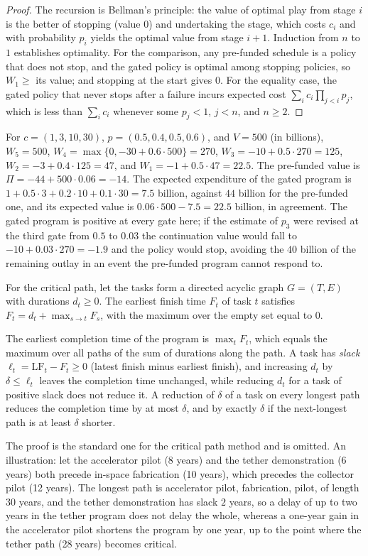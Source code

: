 \begin{proof}
The recursion is Bellman's principle: the value of optimal play from stage $i$ is the better of stopping (value $0$) and undertaking the stage, which costs $c_i$ and with probability $p_i$ yields the optimal value from stage $i+1$. Induction from $n$ to $1$ establishes optimality. For the comparison, any pre-funded schedule is a policy that does not stop, and the gated policy is optimal among stopping policies, so $W_1\ge$ its value; and stopping at the start gives $0$. For the equality case, the gated policy that never stops after a failure incurs expected cost $\sum_ic_i\prod_{j<i}p_j$, which is less than $\sum_ic_i$ whenever some $p_j<1$, $j<n$, and $n\ge2$.
\end{proof}

For $c=(1,3,10,30)$, $p=(0.5,0.4,0.5,0.6)$, and $V=500$ (in billions), $W_5=500$, $W_4=\max\{0,-30+0.6\cdot500\}=270$, $W_3=-10+0.5\cdot270=125$, $W_2=-3+0.4\cdot125=47$, and $W_1=-1+0.5\cdot47=22.5$. The pre-funded value is $\Pi=-44+500\cdot0.06=-14$. The expected expenditure of the gated program is $1+0.5\cdot3+0.2\cdot10+0.1\cdot30=7.5$ billion, against $44$ billion for the pre-funded one, and its expected value is $0.06\cdot500-7.5=22.5$ billion, in agreement. The gated program is positive at every gate here; if the estimate of $p_3$ were revised at the third gate from $0.5$ to $0.03$ the continuation value would fall to $-10+0.03\cdot270=-1.9$ and the policy would stop, avoiding the $40$ billion of the remaining outlay in an event the pre-funded program cannot respond to.

For the critical path, let the tasks form a directed acyclic graph $G=(T,E)$ with durations $d_t\ge0$. The earliest finish time $F_t$ of task $t$ satisfies $F_t=d_t+\max_{s\to t}F_s$, with the maximum over the empty set equal to $0$.

\begin{proposition}
The earliest completion time of the program is $\max_tF_t$, which equals the maximum over all paths of the sum of durations along the path. A task has \emph{slack} $\ell_t=\mathrm{LF}_t-F_t\ge0$ (latest finish minus earliest finish), and increasing $d_t$ by $\delta\le\ell_t$ leaves the completion time unchanged, while reducing $d_t$ for a task of positive slack does not reduce it. A reduction of $\delta$ of a task on every longest path reduces the completion time by at most $\delta$, and by exactly $\delta$ if the next-longest path is at least $\delta$ shorter.
\end{proposition}

The proof is the standard one for the critical path method and is omitted. An illustration: let the accelerator pilot (8 years) and the tether demonstration (6 years) both precede in-space fabrication (10 years), which precedes the collector pilot (12 years). The longest path is accelerator pilot, fabrication, pilot, of length $30$ years, and the tether demonstration has slack $2$ years, so a delay of up to two years in the tether program does not delay the whole, whereas a one-year gain in the accelerator pilot shortens the program by one year, up to the point where the tether path (28 years) becomes critical.
